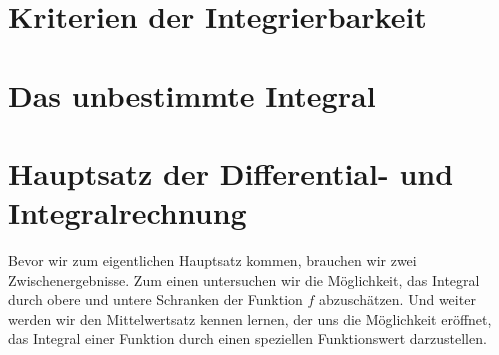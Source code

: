 \section{Kriterien der Integrierbarkeit}
\begin{TODO}
\end{TODO}
 

\section{Das unbestimmte Integral}
\begin{TODO}
\end{TODO}


\section{Hauptsatz der Differential- und Integralrechnung}

Bevor wir zum eigentlichen Hauptsatz kommen, brauchen wir zwei Zwischenergebnisse. Zum einen untersuchen wir die Möglichkeit, das Integral durch obere und untere Schranken der Funktion $f$ abzuschätzen. Und weiter werden wir den Mittelwertsatz kennen lernen, der uns die Möglichkeit eröffnet, das Integral einer Funktion durch einen speziellen Funktionswert darzustellen. 

